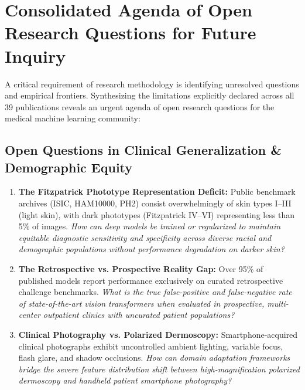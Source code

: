 \section{Consolidated Agenda of Open Research Questions for Future Inquiry}
\label{sec:open_rqs}

A critical requirement of research methodology is identifying unresolved questions and empirical frontiers. Synthesizing the limitations explicitly declared across all 39 publications reveals an urgent agenda of open research questions for the medical machine learning community:

\subsection{Open Questions in Clinical Generalization \& Demographic Equity}
\begin{enumerate}[label=\textbf{OQ-\arabic*.}, leftmargin=*]
    \item \textbf{The Fitzpatrick Phototype Representation Deficit:} Public benchmark archives (ISIC, HAM10000, PH2) consist overwhelmingly of skin types I--III (light skin), with dark phototypes (Fitzpatrick IV--VI) representing less than 5\% of images. \textit{How can deep models be trained or regularized to maintain equitable diagnostic sensitivity and specificity across diverse racial and demographic populations without performance degradation on darker skin?}
    \item \textbf{The Retrospective vs. Prospective Reality Gap:} Over 95\% of published models report performance exclusively on curated retrospective challenge benchmarks. \textit{What is the true false-positive and false-negative rate of state-of-the-art vision transformers when evaluated in prospective, multi-center outpatient clinics with uncurated patient populations?}
    \item \textbf{Clinical Photography vs. Polarized Dermoscopy:} Smartphone-acquired clinical photographs exhibit uncontrolled ambient lighting, variable focus, flash glare, and shadow occlusions. \textit{How can domain adaptation frameworks bridge the severe feature distribution shift between high-magnification polarized dermoscopy and handheld patient smartphone photography?}
\end{enumerate}

